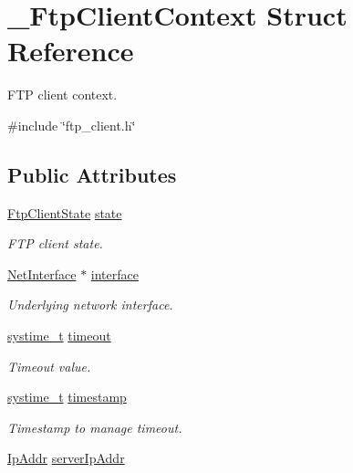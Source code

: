 \hypertarget{struct__FtpClientContext}{}\section{\+\_\+\+Ftp\+Client\+Context Struct Reference}
\label{struct__FtpClientContext}


F\+TP client context.  




{\ttfamily \#include \char`\"{}ftp\+\_\+client.\+h\char`\"{}}

\subsection*{Public Attributes}
\begin{DoxyCompactItemize}
\item 
\hyperlink{ftp__client_8h_a27b79c28175d6b10ba3395f09b15d32f}{Ftp\+Client\+State} \hyperlink{struct__FtpClientContext_ab3d3243d5ccbc94b6831a5c4cab236f0}{state}
\begin{DoxyCompactList}\small\item\em F\+TP client state. \end{DoxyCompactList}\item 
\hyperlink{net_8h_a2234db8911a1148c9159979d8f5e0d6b}{Net\+Interface} $\ast$ \hyperlink{struct__FtpClientContext_a1fbce0f8398f3233643c011c67715a7c}{interface}
\begin{DoxyCompactList}\small\item\em Underlying network interface. \end{DoxyCompactList}\item 
\hyperlink{compiler__port_8h_ae3e32a98d431a02106616da3071832dd}{systime\+\_\+t} \hyperlink{struct__FtpClientContext_a5999107428b02a4b86b5e9cb30e75e32}{timeout}
\begin{DoxyCompactList}\small\item\em Timeout value. \end{DoxyCompactList}\item 
\hyperlink{compiler__port_8h_ae3e32a98d431a02106616da3071832dd}{systime\+\_\+t} \hyperlink{struct__FtpClientContext_aae36f0f77b41cc5fd7e82000bd18f6d1}{timestamp}
\begin{DoxyCompactList}\small\item\em Timestamp to manage timeout. \end{DoxyCompactList}\item 
\hyperlink{structIpAddr}{Ip\+Addr} \hyperlink{struct__FtpClientContext_a8171ee967d54074438de5fb81c7cb4b8}{server\+Ip\+Addr}

\end{DoxyCompactItemize}

